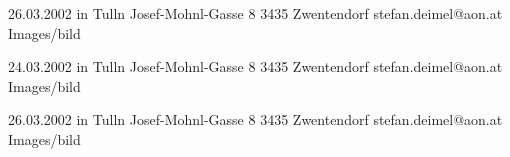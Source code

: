 
\begin{Diplomandenvorstellung}

		  {26.03.2002 in Tulln}
		  {Josef-Mohnl-Gasse 8}
		  {3435 Zwentendorf}
		  {
		  }
		  {stefan.deimel@aon.at}
		  {Images/bild}
\newpage	  

		  {24.03.2002 in Tulln}
		  {Josef-Mohnl-Gasse 8}
		  {3435 Zwentendorf}
		  {
		  }
		  {stefan.deimel@aon.at}
		  {Images/bild}
\newpage

		  {26.03.2002 in Tulln}
		  {Josef-Mohnl-Gasse 8}
		  {3435 Zwentendorf}
		  {
		  }
		  {stefan.deimel@aon.at}
		  {Images/bild}
		  
\end{Diplomandenvorstellung}

